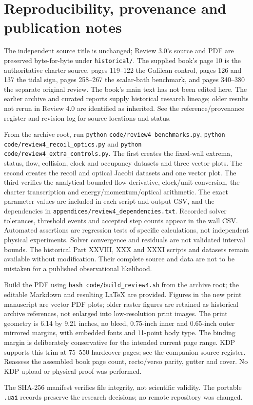 \documentclass[
  11pt,
  twoside]{article}
\begin{document}
\section{Reproducibility, provenance and publication
notes}\label{reproducibility-provenance-and-publication-notes}

The independent source title is unchanged; Review 3.0's source and PDF
are preserved byte-for-byte under \nolinkurl{historical/}. The supplied
book's page 10 is the authoritative charter source, pages 119--122 the
Galilean control, pages 126 and 137 the tidal sign, pages 258--267 the
scalar-bath benchmark, and pages 340--380 the separate original review.
The book's main text has not been edited here. The earlier archive and
curated reports supply historical research lineage; older results not
rerun in Review 4.0 are identified as inherited. See the
reference/provenance register and revision log for source locations and
status.

From the archive root, run \texttt{python}
\nolinkurl{code/review4_benchmarks.py}, \texttt{python}
\nolinkurl{code/review4_recoil_optics.py} and \texttt{python}
\nolinkurl{code/review4_extra_controls.py}. The first creates the
fixed-wall extrema, status, flow, collision, clock and occupancy
datasets and three vector plots. The second creates the recoil and
optical Jacobi datasets and one vector plot. The third verifies the
analytical bounded-flow derivative, clock/unit conversion, the charter
transcription and energy/momentum/optical arithmetic. The exact
parameter values are included in each script and output CSV, and the
dependencies in \nolinkurl{appendices/review4_dependencies.txt}.
Recorded solver tolerances, threshold events and accepted step counts
appear in the wall CSV. Automated assertions are regression tests of
specific calculations, not independent physical experiments. Solver
convergence and residuals are not validated interval bounds. The
historical Part XXVIII, XXX and XXXI scripts and datasets remain
available without modification. Their complete source and data are not
to be mistaken for a published observational likelihood.

Build the PDF using \nolinkurl{bash code/build_review4.sh} from the
archive root; the editable Markdown and resulting LaTeX are provided.
Figures in the new print manuscript are vector PDF plots; older raster
figures are retained as historical archive references, not enlarged into
low-resolution print images. The print geometry is 6.14 by 9.21 inches,
no bleed, 0.75-inch inner and 0.65-inch outer mirrored margins, with
embedded fonts and 11-point body type. The binding margin is
deliberately conservative for the intended current page range. KDP
supports this trim at 75--550 hardcover pages; see the companion source
register. Reassess the assembled book page count, recto/verso parity,
gutter and cover. No KDP upload or physical proof was performed.

The SHA-256 manifest verifies file integrity, not scientific validity.
The portable \texttt{.uai} records preserve the research decisions; no
remote repository was changed.
\end{document}
